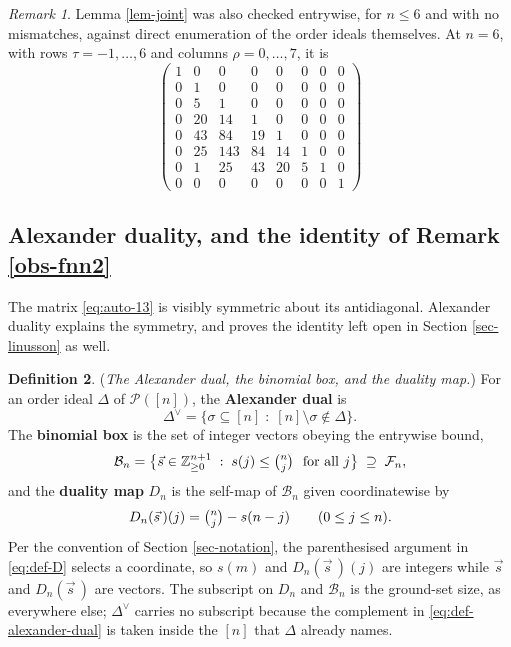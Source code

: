 \documentclass[11pt, a4paper, abstract=yes]{scrartcl}
\theoremstyle{definition}
\newtheorem{definition}{Definition}
\theoremstyle{remark}
\newtheorem{remark}[definition]{Remark}
\theoremstyle{plain}
\begin{document}
\begin{remark}
Lemma \ref{lem-joint} was also checked entrywise, for \(n\le6\) and with no mismatches, against
direct enumeration of the order ideals themselves. At \(n=6\), with rows \(\tau=-1,\dots,6\) and
columns \(\rho=0,\dots,7\), it is
\begin{equation}\label{eq:auto-13}
\begin{pmatrix}
1&0&0&0&0&0&0&0\\
0&1&0&0&0&0&0&0\\
0&5&1&0&0&0&0&0\\
0&20&14&1&0&0&0&0\\
0&43&84&19&1&0&0&0\\
0&25&143&84&14&1&0&0\\
0&1&25&43&20&5&1&0\\
0&0&0&0&0&0&0&1
\end{pmatrix}
\end{equation}
\label{rem-A-verified}
\end{remark}
\subsection{Alexander duality, and the identity of Remark \ref{obs-fnn2}}
\label{sec:orgc1f38df}

The matrix \eqref{eq:auto-13} is visibly symmetric about its antidiagonal. Alexander duality
explains the symmetry, and proves the identity left open in Section \ref{sec-linusson} as well.

\begin{definition}
(\emph{The Alexander dual, the binomial box, and the duality map.}) For an order ideal \(\Delta\) of
\(\mathcal P([n])\), the \textbf{Alexander dual} is
\begin{equation}\label{eq:def-alexander-dual}
  \Delta^{\vee}=\bigl\lbrace\sigma\subseteq[n]\;:\;[n]\setminus\sigma\notin\Delta\bigr\rbrace .
\end{equation}
The \textbf{binomial box} is the set of integer vectors obeying the entrywise bound,
\begin{equation}\label{eq:binomial-box}
  \mathcal B_n=\bigl\lbrace\vec s\in\mathbb Z_{\ge0}^{n+1}\;:\;s(j)\le\tbinom nj\ \text{ for all }j\bigr\rbrace
  \;\supseteq\;\mathcal F_n ,
\end{equation}
and the \textbf{duality map} \(D_n\) is the self-map of \(\mathcal B_n\) given coordinatewise by
\begin{equation}\label{eq:def-D}
  D_n(\vec s\,)(j)=\tbinom nj-s(n-j) \qquad (0\le j\le n).
\end{equation}
Per the convention of Section \ref{sec-notation}, the parenthesised argument in
\eqref{eq:def-D} selects a coordinate, so \(s(m)\) and \(D_n(\vec s\,)(j)\) are integers while
\(\vec s\) and \(D_n(\vec s\,)\) are vectors. The subscript on \(D_n\) and \(\mathcal B_n\) is the
ground-set size, as everywhere else; \(\Delta^{\vee}\) carries no subscript because the
complement in \eqref{eq:def-alexander-dual} is taken inside the \([n]\) that \(\Delta\) already
names.
\label{def-alexander}
\end{definition}
\end{document}
